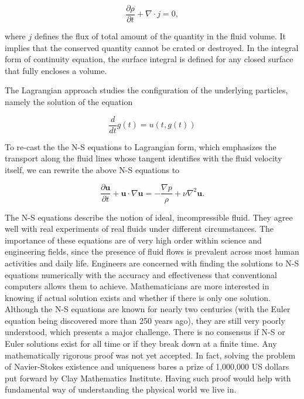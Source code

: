 \begin{equation}
\frac{\partial \rho}{\partial t} + \nabla \cdot j = 0,
\end{equation}

where $j$ defines the flux of total amount of the quantity in the fluid volume. It implies that the conserved quantity cannot be crated or destroyed. In the integral form of continuity equation, the surface integral is defined for any closed surface that fully encloses a volume. 

The Lagrangian approach studies the configuration of the underlying particles, namely the solution of the equation

\begin{equation} 
	\label{eqn:lagrange-hydro}
	\frac{d}{dt} g(t) = u(t, g(t))
\end{equation}

To re-cast the the N-S equations to Lagrangian form, which emphasizes the transport along the fluid lines whose tangent identifies with the fluid velocity itself, we can rewrite the above N-S equations to

\begin{equation} 
	\label{eqn:lagrange-ns-modern}
	\frac{\partial \bm{u}}{\partial t} + \bm{u} \cdot \nabla \bm{u} = - \frac{\nabla p}{\rho} + \nu \nabla^2 \bm{u}.
\end{equation}

The N-S equations describe the notion of ideal, incompressible fluid. They agree well with real experiments of real fluids under different circumstances. The importance of these equations are of very high order within science and engineering fields, since the presence of fluid flows is prevalent across most human activities and daily life. Engineers are concerned with finding the solutions to N-S equations numerically with the accuracy and effectiveness that conventional computers allows them to achieve. Mathematicians are more interested in knowing if actual solution exists and whether if there is only one solution. Although the N-S equations are known for nearly two centuries (with the Euler equation being discovered more than 250 years ago), they are still very poorly understood, which presents a major challenge. There is no consensus if N-S or Euler solutions exist for all time or if they break down at a finite time. Any mathematically rigorous proof was not yet accepted. In fact, solving the problem of Navier-Stokes existence and uniqueness bares a prize of 1,000,000 US dollars put forward by Clay Mathematics Institute. Having such proof would help with fundamental way of understanding the physical world we live in.

